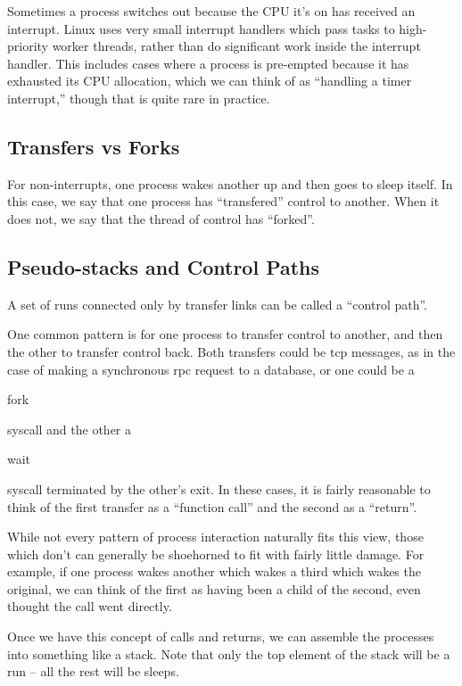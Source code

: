 \documentclass{article}
\begin{document}
Sometimes a process switches out because the CPU it's on has received an interrupt.  Linux uses very small interrupt handlers which pass tasks to high-priority worker threads, rather than do significant work inside the interrupt handler.  This includes cases where a process is pre-empted because it has exhausted its CPU allocation, which we can think of as ``handling a timer interrupt,'' though that is quite rare in practice.

\subsection{Transfers vs Forks}

For non-interrupts, one process wakes another up and then goes to sleep itself.  In this case, we say that one process has ``transfered'' control to another.  When it does not, we say that the thread of control has ``forked''.

\subsection{Pseudo-stacks and Control Paths}

A set of runs connected only by transfer links can be called a ``control path''.

One common pattern is for one process to transfer control to another, and then the other to transfer control back.  Both transfers could be tcp messages, as in the case of making a synchronous rpc request to a database, or one could be a \begin{tt}fork\end{tt} syscall and the other a \begin{tt}wait\end{tt} syscall terminated by the other's exit.  In these cases, it is fairly reasonable to think of the first transfer as a ``function call'' and the second as a ``return''.

While not every pattern of process interaction naturally fits this view, those which don't can generally be shoehorned to fit with fairly little damage.  For example, if one process wakes another which wakes a third which wakes the original, we can think of the first as having been a child of the second, even thought the call went directly.

Once we have this concept of calls and returns, we can assemble the processes into something like a stack.  Note that only the top element of the stack will be a run -- all the rest will be sleeps.
\end{document}
